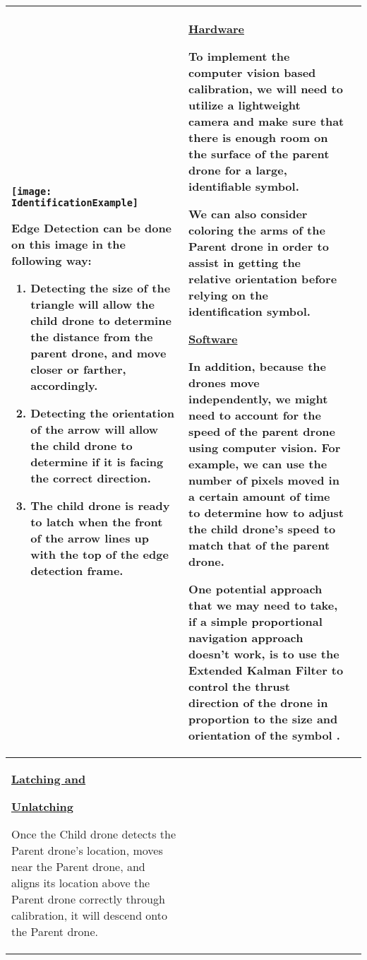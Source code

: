 \documentclass[paper=a4, fontsize=12pt]{scrartcl}
\begin{document}
\begin{longtable} { |p{}|p{}|p{}| }
	\begin{center}
		\texttt{[image: IdentificationExample]}
	\end{center}

	Edge Detection can be done on this image in the following way:
	\begin{enumerate}
		\item Detecting the size of the triangle will allow the child drone to determine the distance from the parent drone, and move closer or farther, accordingly.
		\item Detecting the orientation of the arrow will allow the child drone to determine if it is facing the correct direction.
		\item The child drone is ready to latch when the front of the arrow lines up with the top of the edge detection frame. 
	\end{enumerate} 
	& 
	\underline{Hardware}\par
	To implement the computer vision based calibration, we will need to utilize a lightweight camera and make sure that there is enough room on the surface of the parent drone for a large, identifiable symbol.\par\hfill\par 
	We can also consider coloring the arms of the Parent drone in order to assist in getting the relative orientation before relying on the identification symbol.\par\hfill\par
	\underline{Software}\par
	In addition, because the drones move independently, we might need to account for the speed of the parent drone using computer vision.
	For example, we can use the number of pixels moved in a certain amount of time to determine how to adjust the child drone's speed to match that of the parent drone.\par\hfill\par 
	One potential approach that we may need to take, if a simple proportional navigation approach doesn't work, is to use the Extended Kalman Filter to control the thrust direction of the drone in proportion to the size and orientation of the symbol \cite{falanga2017ssrr}. \\
	\hline
	\underline{\textbf{Latching and}}\par\underline{\textbf{Unlatching}}\par
	Once the Child drone detects the Parent drone's location, moves near the Parent drone, and aligns its location above the Parent drone correctly through calibration, it will descend onto the Parent drone.

\end{longtable}
\end{document}
